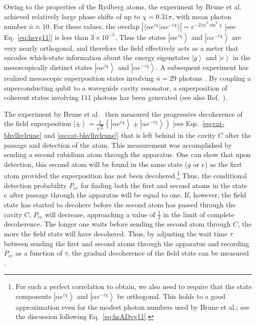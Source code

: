 \documentclass[3p,sort&compress]{elsarticle}
\newcommand{\ket}[1]{\left\vert{#1}\right\rangle}
\newcommand{\braket}[2]{\ensuremath{{\langle #1}|{#2 \rangle}}}
\providecommand{\abs}[1]{\left\lvert#1\right\rvert}
\newcommand{\E}{\ensuremath{e}}
\newcommand{\I}{\ensuremath{i}}
\begin{document}
Owing to the properties of the Rydberg atoms, the experiment by Brune et al.\ \cite{Brune:1996:om} achieved relatively large phase shifts of up to $\chi = 0.31\pi$, with mean photon number $\bar{n} \approx 10$. For these values, the overlap $\abs{\braket{\alpha \E^{\I \chi}}{\alpha \E^{-\I \chi}}}= \E^{- 2\abs{\alpha}^2\sin^2\chi}$ [see Eq.~\eqref{eq:hsvg11}] is less than $3 \times 10^{-5}$. Thus the states $\ket{\alpha \E^{\I \chi}}$ and $\ket{\alpha \E^{-\I \chi}}$ are very nearly orthogonal, and therefore the field effectively acts as a meter that encodes which-state information about the energy eigenstates $\ket{g}$ and $\ket{e}$ in the mesoscopically distinct states $\ket{\alpha \E^{\I \chi}}$ and $\ket{\alpha \E^{-\I \chi}}$. A subsequent experiment has realized mesoscopic superposition states involving $\bar{n}=29$ photons \cite{Auffeves:2003:za}. By coupling a superconducting qubit to a waveguide cavity resonator, a superposition of coherent states involving 111 photons has been generated \cite{Vlastakis:2013:pp} (see also Ref.~\cite{Hermann-Avigliano:2015:tt}). 

The experiment by Brune et al.\ \cite{Brune:1996:om,Maitre:1997:tv} then measured the progressive decoherence of the field superposition $\ket{\pm}=\frac{1}{\sqrt{2}} \left( \ket{\alpha \E^{\I \chi}} \pm \ket{\alpha \E^{-\I \chi}} \right)$ [see Eqs.~\eqref{eq:cat-bhvlhvlrune} and \eqref{eq:cat-bhvlhvlrune}] that is left behind in the cavity $C$ after the passage and detection of the atom. This measurement was accomplished by sending a second rubidium atom through the apparatus. One can show \cite{Davidovich:1996:sa, Maitre:1997:tv,Raimond:2001:aa,Kaiser:2001:tm,Schlosshauer:2007:un} that upon detection, this second atom will be found in the same state ($g$ or $e$) as the first atom provided the superposition has not been decohered.\footnote{For such a perfect correlation to obtain, we also need to require that the state components $\ket{\alpha \E^{\I \chi}}$ and $\ket{\alpha \E^{-\I \chi}}$ be orthogonal.  This holds to a good approximation even for the modest photon numbers used by Brune et al.; see the discussion following Eq.~\eqref{eq:hsADvg11}.} Thus, the conditional detection probability $P_{ee}$ for finding both the first and second atoms in the state $e$ after passage through the apparatus will be equal to one. If, however, the field state has started to decohere before the second atom has passed through the cavity $C$, $P_{ee}$ will decrease, approaching a value of $\frac{1}{2}$ in the limit of complete decoherence. The longer one waits before sending the second atom through $C$, the more the field state will have decohered. Thus, by adjusting the wait time $\tau$ between sending the first and second atoms through the apparatus and recording $P_{ee}$ as a function of $\tau$, the gradual decoherence of the field state can be measured \cite{Davidovich:1996:sa, Maitre:1997:tv,Raimond:2001:aa}. 
\end{document}
